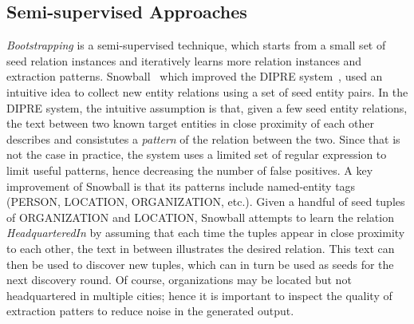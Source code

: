 \subsection{Semi-supervised Approaches}
\textit{Bootstrapping} is a semi-supervised technique, which starts from a small set of seed relation instances and iteratively learns more relation instances and extraction patterns.
Snowball~\cite{agichtein2000snowball} which improved the DIPRE system~\cite{brin1998extracting}, used an intuitive idea to collect new entity relations using a set of seed entity pairs.
In the DIPRE system, the intuitive assumption is that, given a few seed entity relations, the text between two known target entities in close proximity of each other describes and consistutes a \textit{pattern} of the relation between the two. 
Since that is not the case in practice, the system uses a limited set of regular expression to limit useful patterns, hence decreasing the number of false positives.
A key improvement of Snowball
is that its patterns include named-entity tags (PERSON, LOCATION, ORGANIZATION, etc.).
Given a handful of seed tuples of ORGANIZATION and LOCATION, Snowball attempts to learn the relation \textit{HeadquarteredIn} by assuming that each time the tuples appear in close proximity to each other, 
the text in between illustrates the desired relation.
This text can then be used to discover new tuples, which can in turn be used as seeds for the next discovery round.
Of course, organizations may be located but not headquartered in multiple cities;
hence it is important to inspect the quality of extraction patters to reduce noise in the generated output.


